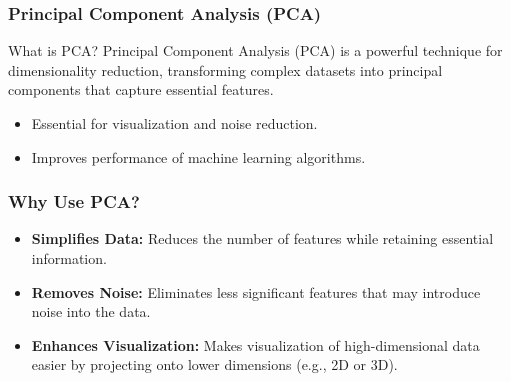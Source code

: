 \documentclass[aspectratio=169]{beamer}
\begin{document}
\begin{frame}
    \frametitle{Principal Component Analysis (PCA)}
    \begin{block}{What is PCA?}
        Principal Component Analysis (PCA) is a powerful technique for dimensionality reduction, transforming complex datasets into principal components that capture essential features.
    \end{block}
    \begin{itemize}
        \item Essential for visualization and noise reduction.
        \item Improves performance of machine learning algorithms.
    \end{itemize}
\end{frame}

\begin{frame}
    \frametitle{Why Use PCA?}
    \begin{itemize}
        \item \textbf{Simplifies Data:} Reduces the number of features while retaining essential information.
        \item \textbf{Removes Noise:} Eliminates less significant features that may introduce noise into the data.
        \item \textbf{Enhances Visualization:} Makes visualization of high-dimensional data easier by projecting onto lower dimensions (e.g., 2D or 3D).
    \end{itemize}
\end{frame}
\end{document}
